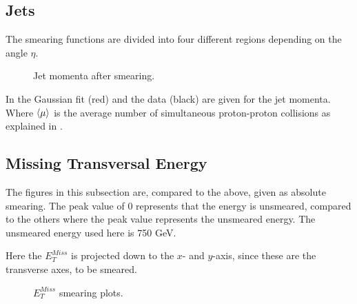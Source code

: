 \subsection{Jets}
The smearing functions are divided into four different regions depending on the angle $\eta$. 
 \begin{figure}[H] %
    \hfill
{}
    \hfill
    \hfill
{}
        \hfill
{}
            \hfill
{}
    \caption{Jet momenta after smearing.}
    \label{fig:jet}
\end{figure}
In  the Gaussian fit (red) and the data (black) are given for the jet momenta. Where $\left<\mu\right>$ is the average number of simultaneous proton-proton collisions as explained in .
\subsection{Missing Transversal Energy}
The figures in this subsection are, compared to the above, given as absolute smearing. The peak value of 0 represents that the energy is unsmeared, compared to the others where the peak value represents the unsmeared energy. The unsmeared energy used here is 750 GeV.

Here the $E_T^{Miss}$ is projected down to the $x$- and $y$-axis, since these are the transverse axes, to be smeared. 
 \begin{figure}[H] %
    \hfill
        \hfill
   \caption{$E_T^{Miss}$ smearing plots.}
    \label{fig:MET}
  \end{figure}
\newpage

